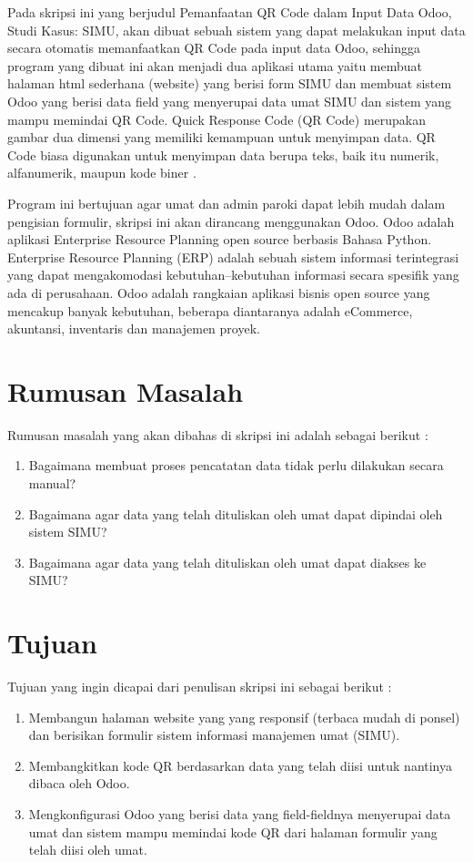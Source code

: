 Pada skripsi ini yang berjudul Pemanfaatan QR Code dalam Input Data Odoo, Studi Kasus: SIMU, akan dibuat sebuah sistem yang dapat melakukan input data secara otomatis memanfaatkan QR Code pada input data Odoo, sehingga program yang dibuat ini akan menjadi dua aplikasi utama yaitu membuat halaman html sederhana (website) yang berisi form SIMU dan membuat sistem Odoo yang berisi data field yang menyerupai data umat SIMU dan sistem yang mampu memindai QR Code. Quick Response Code (QR Code) merupakan gambar dua dimensi yang memiliki kemampuan untuk menyimpan data. QR Code biasa digunakan untuk menyimpan data berupa teks, baik itu numerik, alfanumerik, maupun kode biner \cite{qrcode:13:median}.

Program ini bertujuan agar umat dan admin paroki dapat lebih mudah dalam pengisian formulir, skripsi ini akan dirancang menggunakan Odoo. Odoo adalah aplikasi Enterprise Resource Planning open source berbasis Bahasa Python. Enterprise Resource Planning (ERP) adalah sebuah sistem informasi terintegrasi yang dapat mengakomodasi kebutuhan–kebutuhan informasi secara spesifik yang ada di perusahaan. Odoo adalah rangkaian aplikasi bisnis open source yang mencakup banyak kebutuhan, beberapa diantaranya adalah eCommerce, akuntansi, inventaris dan manajemen proyek.

\section{Rumusan Masalah}
\label{sec:rumusan}
Rumusan masalah yang akan dibahas di skripsi ini adalah sebagai berikut :
\begin{enumerate}
	\item Bagaimana membuat proses pencatatan data tidak perlu dilakukan secara manual?
	\item Bagaimana agar data yang telah dituliskan oleh umat dapat dipindai oleh sistem SIMU?
	\item Bagaimana agar data yang telah dituliskan oleh umat dapat diakses ke SIMU?
\end{enumerate} 


\section{Tujuan}
\label{sec:tujuan}
Tujuan yang ingin dicapai dari penulisan skripsi ini sebagai berikut :
\begin{enumerate}
	\item Membangun halaman website yang yang responsif (terbaca mudah di ponsel) dan berisikan formulir sistem informasi manajemen umat (SIMU).
	\item Membangkitkan kode QR berdasarkan data yang telah diisi untuk nantinya dibaca oleh Odoo.
	\item Mengkonfigurasi Odoo yang berisi data yang field-fieldnya menyerupai data umat dan sistem mampu memindai kode QR dari halaman formulir yang telah diisi oleh umat.
\end{enumerate}


